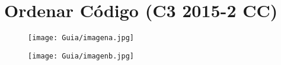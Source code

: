 \section{Ordenar Código (C3 2015-2 CC)}
\begin{figure}[h]
    \centering
    \texttt{[image: Guia/imagena.jpg]}
\end{figure}

\begin{figure}[h]
    \centering
    \texttt{[image: Guia/imagenb.jpg]}
\end{figure}